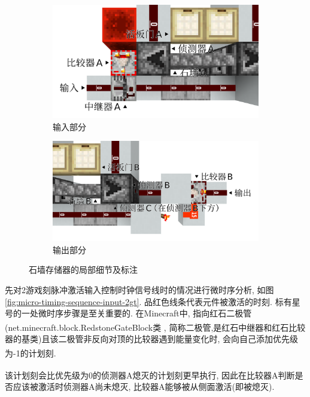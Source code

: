 \documentclass{article}
\newcommand*{\upcite}[1]{
    \textsuperscript{\cite{#1}}
}
\begin{document}
    \begin{figure}[H]
        \centering
        \begin{subfigure}{0.85\linewidth}
            \includegraphics[width=\linewidth]{figures/wall-based-storage-2.png}
            \caption{输入部分}
        \end{subfigure}
        \begin{subfigure}{0.85\linewidth}
            \includegraphics[width=\linewidth]{figures/wall-based-storage-3.png}
            \caption{输出部分}
        \end{subfigure}
        \caption{石墙存储器的局部细节及标注}
        \label{fig:wall-based-storage-2-3}
    \end{figure}

    先对2游戏刻脉冲激活输入控制时钟信号线时的情况进行微时序分析, 如图\ref{fig:micro-timing-sequence-input-2gt}. 品红色线条代表元件被激活的时刻. 标有星号的一处微时序步骤是至关重要的. 在Minecraft中, 指向红石二极管(net.minecraft.block.RedstoneGateBlock类\upcite{bib:yarn}, 简称二极管,是红石中继器和红石比较器的基类)且该二极管非反向对顶的比较器遇到能量变化时, 会向自己添加优先级为-1的计划刻.\upcite{bib:tile-tick-component}\upcite{bib:yarn} 该计划刻会比优先级为0的侦测器A熄灭的计划刻更早执行, 因此在比较器A判断是否应该被激活时侦测器A尚未熄灭, 比较器A能够被从侧面激活(即被熄灭). 
\end{document}
